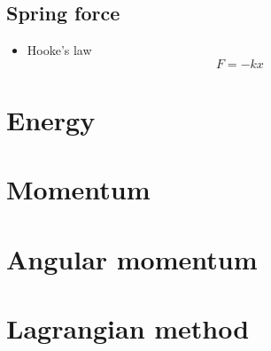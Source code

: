     \subsection{Spring force}
        \begin{itemize}
            \item Hooke's law
                \begin{equation}
                    F=-kx
                \end{equation}
        \end{itemize}

\section{Energy}
\section{Momentum}
\section{Angular momentum}
\section{Lagrangian method}
